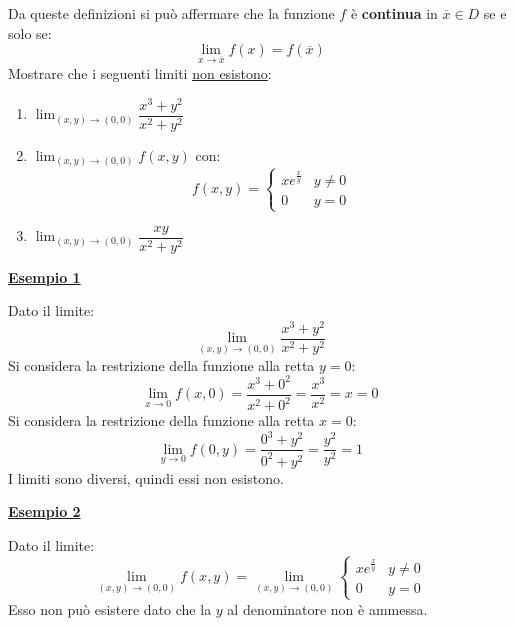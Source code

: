 \documentclass[a4paper]{article}
\newcommand{\definition}[1]{\textcolor{Red3}{\textbf{#1}}}
\newcommand{\example}[1]{\textcolor{Green4}{\textbf{#1}}}
\begin{document}
	\noindent
	Da queste definizioni si può affermare che la funzione $f$ è \definition{continua} in $\overline{x} \in D$ se e solo se:
	\begin{equation*}
		\lim_{x \rightarrow \overline{x}} f\left(x\right) = f\left(\overline{x}\right)
	\end{equation*}
	Mostrare che i seguenti limiti \underline{non esistono}:
	\begin{enumerate}
		\item $\displaystyle\lim_{\left(x,y\right) \rightarrow \left(0,0\right)} \dfrac{x^{3}+y^{2}}{x^{2}+y^{2}}$
		
		\item $\displaystyle\lim_{\left(x,y\right) \rightarrow \left(0,0\right)} f\left(x,y\right)$ con:
		\begin{equation*}
			f\left(x,y\right) = \begin{cases}
				xe^{\frac{x}{y}} & y \ne 0 \\
				0 & y = 0
			\end{cases}
		\end{equation*}

		\item $\displaystyle\lim_{\left(x,y\right) \rightarrow \left(0,0\right)} \dfrac{xy}{x^{2}+y^{2}}$
	\end{enumerate}

	\begin{flushleft}
		\example{\underline{Esempio 1}}
	\end{flushleft}
	Dato il limite:
	\begin{equation*}
		\displaystyle\lim_{\left(x,y\right) \rightarrow \left(0,0\right)} \dfrac{x^{3}+y^{2}}{x^{2}+y^{2}}
	\end{equation*}
	Si considera la restrizione della funzione alla retta $y=0$:
	\begin{equation*}
		\displaystyle\lim_{x \rightarrow 0} f\left(x,0\right) = \dfrac{x^{3}+0^{2}}{x^{2}+0^{2}} = \dfrac{x^{3}}{x^{2}} = x = 0
	\end{equation*}
	Si considera la restrizione della funzione alla retta $x=0$:
	\begin{equation*}
		\displaystyle\lim_{y \rightarrow 0} f\left(0,y\right) = \dfrac{0^{3}+y^{2}}{0^{2}+y^{2}} = \dfrac{y^{2}}{y^{2}} = 1
	\end{equation*}
	I limiti sono diversi, quindi essi non esistono.

	\begin{flushleft}
		\example{\underline{Esempio 2}}
	\end{flushleft}
	Dato il limite:
	\begin{equation*}
		\displaystyle\lim_{\left(x,y\right) \rightarrow \left(0,0\right)} f\left(x,y\right) = \displaystyle\lim_{\left(x,y\right) \rightarrow \left(0,0\right)} \begin{cases}
			xe^{\frac{x}{y}} & y \ne 0 \\
			0 & y = 0
		\end{cases}
	\end{equation*}
	Esso non può esistere dato che la $y$ al denominatore non è ammessa.
\end{document}
